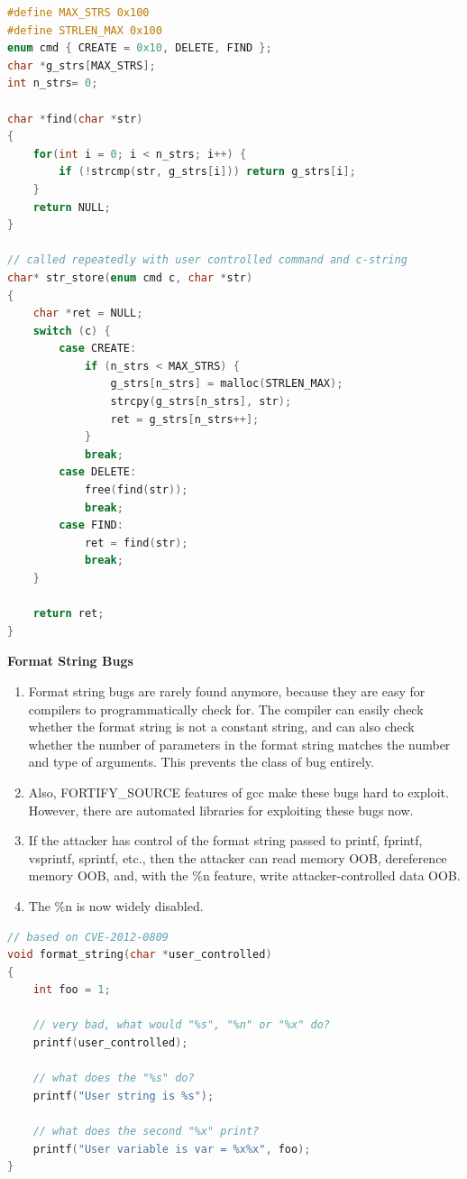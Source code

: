 \documentclass[12pt]{Training}
\begin{document}
\begin{sectionbox}
\begin{lstlisting}[language=C, caption={Heap Corruption}]
#define MAX_STRS 0x100
#define STRLEN_MAX 0x100
enum cmd { CREATE = 0x10, DELETE, FIND };
char *g_strs[MAX_STRS];
int n_strs= 0;

char *find(char *str)
{
    for(int i = 0; i < n_strs; i++) {
        if (!strcmp(str, g_strs[i])) return g_strs[i];
    }   
    return NULL;
}

// called repeatedly with user controlled command and c-string
char* str_store(enum cmd c, char *str)
{
    char *ret = NULL;
    switch (c) {
        case CREATE:
            if (n_strs < MAX_STRS) {
                g_strs[n_strs] = malloc(STRLEN_MAX);
                strcpy(g_strs[n_strs], str);
                ret = g_strs[n_strs++];
            }
            break;
        case DELETE:
            free(find(str));
            break;
        case FIND:
            ret = find(str);
            break;
    }   

    return ret;
}
\end{lstlisting}
\end{sectionbox}

\textbf{Format String Bugs}
\begin{enumerate}
    \item Format string bugs are rarely found anymore, because they are easy for compilers to programmatically check for. The compiler can easily check whether the format string is not a constant string, and can also check whether the number of parameters in the format string matches the number and type of arguments. This prevents the class of bug entirely.
    \item Also, FORTIFY\_SOURCE features of gcc make these bugs hard to exploit. However, there are automated libraries for exploiting these bugs now. 
    \item If the attacker has control of the format string passed to printf, fprintf, vsprintf, sprintf, etc., then the attacker can read memory OOB, dereference memory OOB, and, with the \%n feature, write attacker-controlled data OOB.
    \item The \%n is now widely disabled.
\end{enumerate}
\begin{sectionbox}
\begin{lstlisting}[language=C, caption={Format Strings}]
// based on CVE-2012-0809
void format_string(char *user_controlled)
{
    int foo = 1;

    // very bad, what would "%s", "%n" or "%x" do?
    printf(user_controlled); 

    // what does the "%s" do?
    printf("User string is %s");

    // what does the second "%x" print?
    printf("User variable is var = %x%x", foo);
}
\end{lstlisting}
\end{sectionbox}
\end{document}
